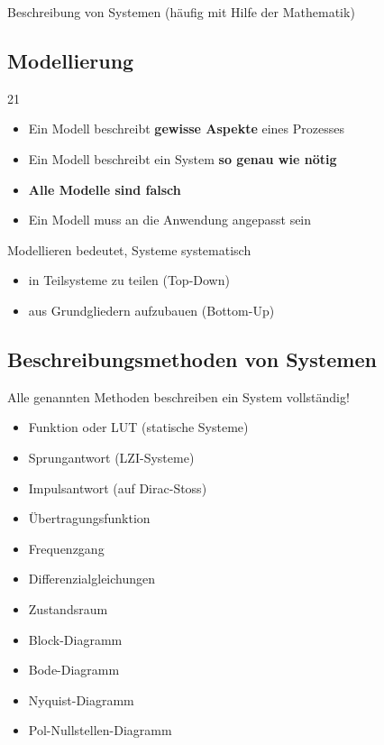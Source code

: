 Beschreibung von Systemen (häufig mit Hilfe der Mathematik)


\subsection{Modellierung}{21}

\begin{itemize}
	\item Ein Modell beschreibt \textbf{gewisse Aspekte} eines Prozesses
	\item Ein Modell beschreibt ein System \textbf{so genau wie nötig}
	\item \textbf{Alle Modelle sind falsch}
	\item Ein Modell muss an die Anwendung angepasst sein
\end{itemize}

\vspace{0.2cm}

Modellieren bedeutet, Systeme systematisch

\vspace{0.1cm}
\begin{itemize}
	\item in Teilsysteme zu teilen (Top-Down)
	\item aus Grundgliedern aufzubauen (Bottom-Up)
\end{itemize}

\columnbreak


\subsection{Beschreibungsmethoden von Systemen}

Alle genannten Methoden beschreiben ein System vollständig!

\vspace{0.2cm}

\begin{minipage}[t]{0.6\columnwidth}
	\raggedright

	\begin{itemize}
		\item Funktion oder LUT (statische Systeme)
		\item Sprungantwort (LZI-Systeme)
		\item Impulsantwort (auf Dirac-Stoss) 
		\item Übertragungsfunktion
		\item Frequenzgang
	\end{itemize}
\end{minipage}
\hfill
\begin{minipage}[t]{0.38\columnwidth}
	\raggedright

	\begin{itemize}
		\item Differenzialgleichungen
		\item Zustandsraum
		\item Block-Diagramm
		\item Bode-Diagramm
		\item Nyquist-Diagramm
		\item Pol-Nullstellen-Diagramm
	\end{itemize}
\end{minipage}

